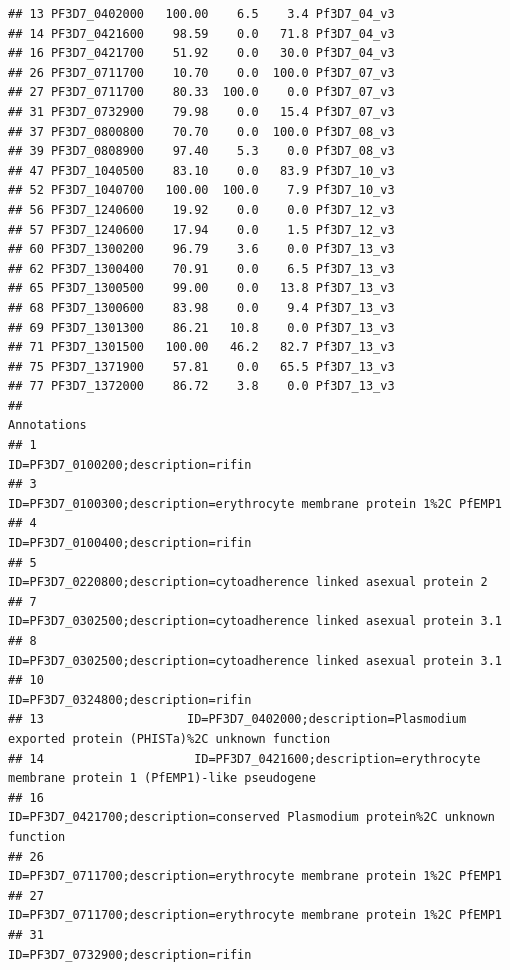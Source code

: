 \documentclass[12pt, a4paper]{article}\usepackage[]{graphicx}\usepackage[]{color}
\makeatletter
\newenvironment{kframe}{%
 \def\at@end@of@kframe{}%
 \ifinner\ifhmode%
  \def\at@end@of@kframe{\end{minipage}}%
  \begin{minipage}{\columnwidth}%
 \fi\fi%
 \def\FrameCommand##1{\hskip\@totalleftmargin \hskip-\fboxsep
 \colorbox{shadecolor}{##1}\hskip-\fboxsep
     \hskip-\linewidth \hskip-\@totalleftmargin \hskip\columnwidth}%
 \MakeFramed {\advance\hsize-\width
   \@totalleftmargin\z@ \linewidth\hsize
   \@setminipage}}%
 {\par\unskip\endMakeFramed%
 \at@end@of@kframe}
\newenvironment{knitrout}{}{} %
\makeatother
\begin{document}
\begin{knitrout}
\begin{kframe}
\begin{verbatim}
## 13 PF3D7_0402000   100.00    6.5    3.4 Pf3D7_04_v3
## 14 PF3D7_0421600    98.59    0.0   71.8 Pf3D7_04_v3
## 16 PF3D7_0421700    51.92    0.0   30.0 Pf3D7_04_v3
## 26 PF3D7_0711700    10.70    0.0  100.0 Pf3D7_07_v3
## 27 PF3D7_0711700    80.33  100.0    0.0 Pf3D7_07_v3
## 31 PF3D7_0732900    79.98    0.0   15.4 Pf3D7_07_v3
## 37 PF3D7_0800800    70.70    0.0  100.0 Pf3D7_08_v3
## 39 PF3D7_0808900    97.40    5.3    0.0 Pf3D7_08_v3
## 47 PF3D7_1040500    83.10    0.0   83.9 Pf3D7_10_v3
## 52 PF3D7_1040700   100.00  100.0    7.9 Pf3D7_10_v3
## 56 PF3D7_1240600    19.92    0.0    0.0 Pf3D7_12_v3
## 57 PF3D7_1240600    17.94    0.0    1.5 Pf3D7_12_v3
## 60 PF3D7_1300200    96.79    3.6    0.0 Pf3D7_13_v3
## 62 PF3D7_1300400    70.91    0.0    6.5 Pf3D7_13_v3
## 65 PF3D7_1300500    99.00    0.0   13.8 Pf3D7_13_v3
## 68 PF3D7_1300600    83.98    0.0    9.4 Pf3D7_13_v3
## 69 PF3D7_1301300    86.21   10.8    0.0 Pf3D7_13_v3
## 71 PF3D7_1301500   100.00   46.2   82.7 Pf3D7_13_v3
## 75 PF3D7_1371900    57.81    0.0   65.5 Pf3D7_13_v3
## 77 PF3D7_1372000    86.72    3.8    0.0 Pf3D7_13_v3
##                                                                                                 Annotations
## 1                                                                        ID=PF3D7_0100200;description=rifin
## 3                                     ID=PF3D7_0100300;description=erythrocyte membrane protein 1%2C PfEMP1
## 4                                                                        ID=PF3D7_0100400;description=rifin
## 5                                       ID=PF3D7_0220800;description=cytoadherence linked asexual protein 2
## 7                                     ID=PF3D7_0302500;description=cytoadherence linked asexual protein 3.1
## 8                                     ID=PF3D7_0302500;description=cytoadherence linked asexual protein 3.1
## 10                                                                       ID=PF3D7_0324800;description=rifin
## 13                    ID=PF3D7_0402000;description=Plasmodium exported protein (PHISTa)%2C unknown function
## 14                     ID=PF3D7_0421600;description=erythrocyte membrane protein 1 (PfEMP1)-like pseudogene
## 16                            ID=PF3D7_0421700;description=conserved Plasmodium protein%2C unknown function
## 26                                    ID=PF3D7_0711700;description=erythrocyte membrane protein 1%2C PfEMP1
## 27                                    ID=PF3D7_0711700;description=erythrocyte membrane protein 1%2C PfEMP1
## 31                                                                       ID=PF3D7_0732900;description=rifin

\end{verbatim}
\end{kframe}
\end{knitrout}
\end{document}
